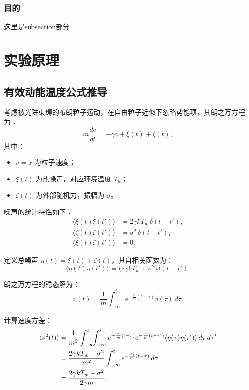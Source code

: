\documentclass[a4paper]{report} %
\begin{document}
\subsection{目的}
这里是subsection部分

\chapter{实验原理}
\section{有效动能温度公式推导}

考虑被光阱束缚的布朗粒子运动，在自由粒子近似下忽略势能项，其朗之万方程为：
\begin{equation}
m \frac{dv}{dt} = -\gamma v + \xi(t) + \zeta(t),
\end{equation}
其中：
\begin{itemize}
    \item $v = \dot{x}$ 为粒子速度；
    \item $\xi(t)$ 为热噪声，对应环境温度 $T_w$；
    \item $\zeta(t)$ 为外部随机力，振幅为 $\sigma$。
\end{itemize}

噪声的统计特性如下：
\begin{align}
\langle \xi(t) \xi(t') \rangle &= 2\gamma k T_w \,\delta(t - t'), \\
\langle \zeta(t) \zeta(t') \rangle &= \sigma^2 \,\delta(t - t'), \\
\langle \xi(t) \zeta(t') \rangle &= 0.
\end{align}

定义总噪声 $\eta(t) = \xi(t) + \zeta(t)$，其自相关函数为：
\begin{equation}
\langle \eta(t) \eta(t') \rangle = \big( 2\gamma k T_w + \sigma^2 \big) \delta(t - t').
\end{equation}

朗之万方程的稳态解为：
\begin{equation}
v(t) = \frac{1}{m} \int_{-\infty}^{t} e^{-\frac{\gamma}{m}(t-\tau)} \eta(\tau) \, d\tau.
\end{equation}

计算速度方差：
\begin{align}
\langle v^2(t) \rangle &= \frac{1}{m^2} \int_{-\infty}^{t} \!\! \int_{-\infty}^{t} 
e^{-\frac{\gamma}{m}(t-\tau)} e^{-\frac{\gamma}{m}(t-\tau')} 
\langle \eta(\tau) \eta(\tau') \rangle \, d\tau \, d\tau' \notag \\
&= \frac{2\gamma k T_w + \sigma^2}{m^2} \int_{-\infty}^{t} e^{-\frac{2\gamma}{m}(t-\tau)} \, d\tau \notag \\
&= \frac{2\gamma k T_w + \sigma^2}{2\gamma m}.
\end{align}
\end{document}
